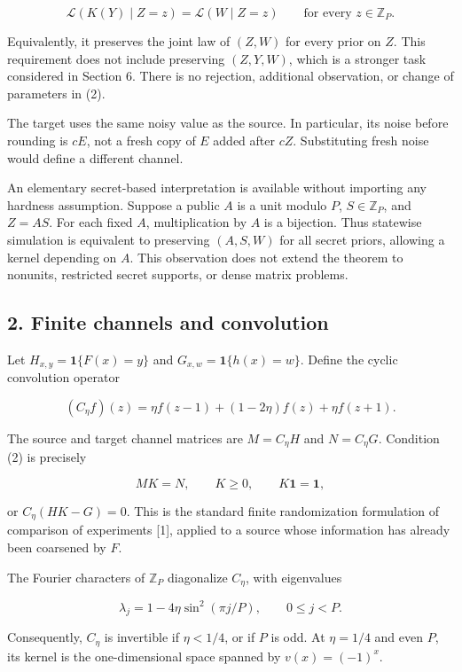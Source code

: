 \documentclass[
]{article}
\begin{document}
\[
\mathcal L(K(Y)\mid Z=z)=\mathcal L(W\mid Z=z)
\qquad\text{for every }z\in\mathbb Z_P.
\tag{2}
\]

Equivalently, it preserves the joint law of \((Z,W)\) for every prior on
\(Z\). This requirement does not include preserving \((Z,Y,W)\), which
is a stronger task considered in Section 6. There is no rejection,
additional observation, or change of parameters in (2).

The target uses the same noisy value as the source. In particular, its
noise before rounding is \(cE\), not a fresh copy of \(E\) added after
\(cZ\). Substituting fresh noise would define a different channel.

An elementary secret-based interpretation is available without importing
any hardness assumption. Suppose a public \(A\) is a unit modulo \(P\),
\(S\in\mathbb Z_P\), and \(Z=AS\). For each fixed \(A\), multiplication
by \(A\) is a bijection. Thus statewise simulation is equivalent to
preserving \((A,S,W)\) for all secret priors, allowing a kernel
depending on \(A\). This observation does not extend the theorem to
nonunits, restricted secret supports, or dense matrix problems.

\subsection{2. Finite channels and
convolution}\label{finite-channels-and-convolution}

Let \(H_{x,y}=\mathbf1\{F(x)=y\}\) and \(G_{x,w}=\mathbf1\{h(x)=w\}\).
Define the cyclic convolution operator

\[
(C_\eta f)(z)=\eta f(z-1)+(1-2\eta)f(z)+\eta f(z+1).
\]

The source and target channel matrices are \(M=C_\eta H\) and
\(N=C_\eta G\). Condition (2) is precisely

\[
MK=N,\qquad K\ge0,\qquad K\mathbf1=\mathbf1,
\tag{3}
\]

or \(C_\eta(HK-G)=0\). This is the standard finite randomization
formulation of comparison of experiments {[}1{]}, applied to a source
whose information has already been coarsened by \(F\).

The Fourier characters of \(\mathbb Z_P\) diagonalize \(C_\eta\), with
eigenvalues

\[
\lambda_j=1-4\eta\sin^2(\pi j/P),\qquad 0\le j<P.
\tag{4}
\]

Consequently, \(C_\eta\) is invertible if \(\eta<1/4\), or if \(P\) is
odd. At \(\eta=1/4\) and even \(P\), its kernel is the one-dimensional
space spanned by \(v(x)=(-1)^x\).
\end{document}
